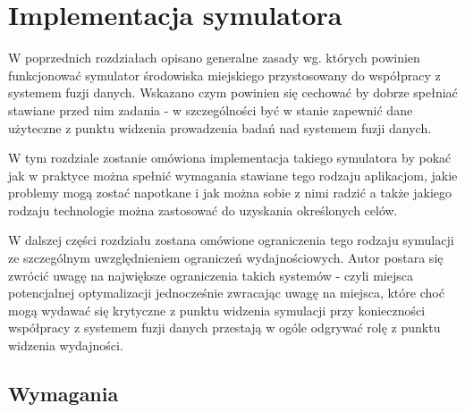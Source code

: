 \chapter{Implementacja symulatora}

\par{
W poprzednich rozdziałach opisano generalne zasady wg. których powinien funkcjonować symulator środowiska miejskiego przystosowany do współpracy z systemem fuzji danych. Wskazano czym powinien się cechować by dobrze spełniać stawiane przed nim zadania - w szczególności być w stanie zapewnić dane użyteczne z punktu widzenia prowadzenia badań nad systemem fuzji danych.
}
\par{
W tym rozdziale zostanie omówiona implementacja takiego symulatora by pokać jak w praktyce można spełnić wymagania stawiane tego rodzaju aplikacjom, jakie problemy mogą zostać napotkane i jak można sobie z nimi radzić a także jakiego rodzaju technologie można zastosować do uzyskania określonych celów.
}
\par{
W dalszej części rozdziału zostana omówione ograniczenia tego rodzaju symulacji ze szczególnym uwzględnieniem ograniczeń wydajnościowych. Autor postara się zwrócić uwagę na największe ograniczenia takich systemów - czyli miejsca potencjalnej optymalizacji jednocześnie zwracając uwagę na miejsca, które choć mogą wydawać się krytyczne z punktu widzenia symulacji przy konieczności współpracy z systemem fuzji danych przestają w ogóle odgrywać rolę z punktu widzenia wydajności.
}

\section[Wymagania][Wymagania]{Wymagania}

